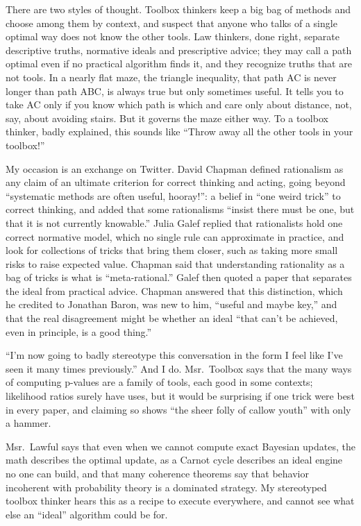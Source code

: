 
There are two styles of thought. Toolbox thinkers keep a big bag of methods and choose among them by context, and suspect that anyone who talks of a single optimal way does not know the other tools. Law thinkers, done right, separate descriptive truths, normative ideals and prescriptive advice; they may call a path optimal even if no practical algorithm finds it, and they recognize truths that are not tools. In a nearly flat maze, the triangle inequality, that path AC is never longer than path ABC, is always true but only sometimes useful. It tells you to take AC only if you know which path is which and care only about distance, not, say, about avoiding stairs. But it governs the maze either way. To a toolbox thinker, badly explained, this sounds like ``Throw away all the other tools in your toolbox!'' 

My occasion is an exchange on Twitter. David Chapman defined rationalism as any claim of an ultimate criterion for correct thinking and acting, going beyond ``systematic methods are often useful, hooray!'': a belief in ``one weird trick'' to correct thinking, and added that some rationalisms ``insist there must be one, but that it is not currently knowable.'' Julia Galef replied that rationalists hold one correct normative model, which no single rule can approximate in practice, and look for collections of tricks that bring them closer, such as taking more small risks to raise expected value. Chapman said that understanding rationality as a bag of tricks is what is ``meta-rational.'' Galef then quoted a paper that separates the ideal from practical advice. Chapman answered that this distinction, which he credited to Jonathan Baron, was new to him, ``useful and maybe key,'' and that the real disagreement might be whether an ideal ``that can't be achieved, even in principle, is a good thing.''

``I'm now going to badly stereotype this conversation in the form I feel like I've seen it many times previously.'' And I do. Msr.\ Toolbox says that the many ways of computing p-values are a family of tools, each good in some contexts; likelihood ratios surely have uses, but it would be surprising if one trick were best in every paper, and claiming so shows ``the sheer folly of callow youth'' with only a hammer.

Msr.\ Lawful says that even when we cannot compute exact Bayesian updates, the math describes the optimal update, as a Carnot cycle describes an ideal engine no one can build, and that many coherence theorems say that behavior incoherent with probability theory is a dominated strategy. My stereotyped toolbox thinker hears this as a recipe to execute everywhere, and cannot see what else an ``ideal'' algorithm could be for. 

